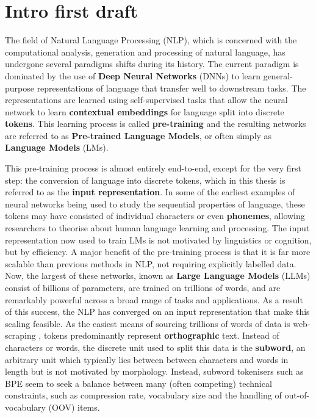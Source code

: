 
\section{Intro first draft}

The field of Natural Language Processing (NLP), which is concerned with the computational analysis, generation and processing of natural language, has undergone several paradigms shifts during its history. The current paradigm is dominated by the use of \textbf{Deep Neural Networks} (DNNs) to learn general-purpose representations of language that transfer well to downstream tasks. The representations are learned using self-supervised tasks that allow the neural network to learn \textbf{contextual embeddings} for language split into discrete \textbf{tokens}. This learning process is called \textbf{pre-training} and the resulting networks are referred to as \textbf{Pre-trained Language Models}, or often simply as \textbf{Language Models} (LMs). 

This pre-training process is almost entirely end-to-end, except for the very first step: the conversion of language into discrete tokens, which in this thesis is referred to as the \textbf{input representation}. In some of the earliest examples of neural networks being used to study the sequential properties of language, these tokens may have consisted of individual characters or even \textbf{phonemes}, allowing researchers to theorise about human language learning and processing. The input representation now used to train LMs is not motivated by linguistics or cognition, but by efficiency. A major benefit of the pre-training process is that it is far more scalable than previous methods in NLP, not requiring explicitly labelled data. Now, the largest of these networks, known as \textbf{Large Language Models} (LLMs) consist of billions of parameters, are trained on trillions of words, and are remarkably powerful across a broad range of tasks and applications. As a result of this success, the NLP has converged on an input representation that make this scaling feasible. As the easiest means of sourcing trillions of words of data is web-scraping \addcites, tokens predominantly represent \textbf{orthographic} text. Instead of characters or words, the discrete unit used to split this data is the \textbf{subword}, an arbitrary unit which typically lies between between characters and words in length but is not motivated by morphology. Instead, subword tokenisers such as BPE seem to seek a balance between many (often competing) technical constraints, such as compression rate, vocabulary size and the handling of out-of-vocabulary (OOV) items.

